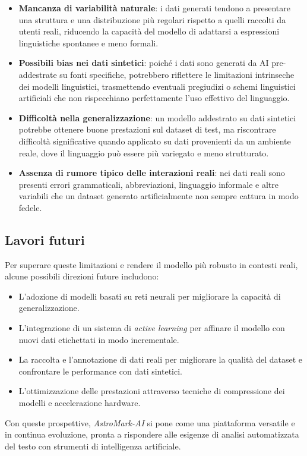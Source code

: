 \begin{itemize}
    \item \textbf{Mancanza di variabilità naturale}: i dati generati tendono a presentare una struttura e una distribuzione più regolari rispetto a quelli raccolti da utenti reali, riducendo la capacità del modello di adattarsi a espressioni linguistiche spontanee e meno formali.
    \item \textbf{Possibili bias nei dati sintetici}: poiché i dati sono generati da AI pre-addestrate su fonti specifiche, potrebbero riflettere le limitazioni intrinseche dei modelli linguistici, trasmettendo eventuali pregiudizi o schemi linguistici artificiali che non rispecchiano perfettamente l'uso effettivo del linguaggio.
    \item \textbf{Difficoltà nella generalizzazione}: un modello addestrato su dati sintetici potrebbe ottenere buone prestazioni sul dataset di test, ma riscontrare difficoltà significative quando applicato su dati provenienti da un ambiente reale, dove il linguaggio può essere più variegato e meno strutturato.
    \item \textbf{Assenza di rumore tipico delle interazioni reali}: nei dati reali sono presenti errori grammaticali, abbreviazioni, linguaggio informale e altre variabili che un dataset generato artificialmente non sempre cattura in modo fedele.
\end{itemize}

\subsection{Lavori futuri}
Per superare queste limitazioni e rendere il modello più robusto in contesti reali, alcune possibili direzioni future includono:
\begin{itemize}
    \item L'adozione di modelli basati su reti neurali per migliorare la capacità di generalizzazione.
    \item L'integrazione di un sistema di \textit{active learning} per affinare il modello con nuovi dati etichettati in modo incrementale.
    \item La raccolta e l'annotazione di dati reali per migliorare la qualità del dataset e confrontare le performance con dati sintetici.
    \item L'ottimizzazione delle prestazioni attraverso tecniche di compressione dei modelli e accelerazione hardware.
\end{itemize}

Con queste prospettive, \textit{AstroMark-AI} si pone come una piattaforma versatile e in continua evoluzione, pronta a rispondere alle esigenze di analisi automatizzata del testo con strumenti di intelligenza artificiale.
